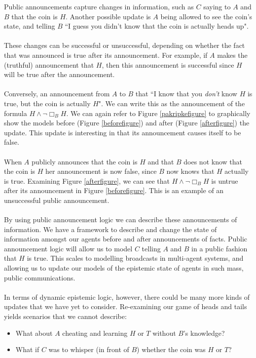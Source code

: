 Public announcements capture changes in information, such as $C$ saying to
$A$ and $B$ that the coin is $H$.
Another possible update is $A$ being allowed to see the coin's state, and
telling $B$ ``I guess you didn't know that the coin is actually heads up".\\
\\
These changes can be successful or unsuccessful, depending on whether the fact
that was announced is true after its announcement.
For example, if $A$ makes the (truthful) announcement that $H$, then this
announcement is successful since $H$ will be true after the announcement.\\
\\
Conversely, an announcement from $A$ to $B$ that ``I know that you {\em don't} know $H$
is true, but the coin is actually $H$".
We can write this as the announcement of the formula $H \land \neg \Box_B H$.
We can again refer to Figure \ref{pakripkefigure} to graphically show the models
before (Figure \ref{beforefigure}) and after (Figure \ref{afterfigure}) the update.
This update is interesting in that its announcement causes itself to be false.\\
\\
When $A$ publicly announces that the coin is $H$ and that $B$ does not know that
the coin is $H$ her announcement is now false, since $B$ now knows that $H$
actually is true.
Examining Figure \ref{afterfigure}, we can see that $H \land \neg \Box_B H$ is
untrue after its announcement in Figure \ref{beforefigure}.
This is an example of an unsuccessful public announcement.\\
\\
By using public announcement logic we can describe these announcements of
information.
We have a framework to describe and change the state of information amongst our
agents before and after announcements of facts.
Public announcement logic will allow us to model $C$ telling $A$ and $B$ in a
public fashion that $H$ is true.
This scales to modelling broadcasts in multi-agent systems, and allowing us to
update our models of the epistemic state of agents in such mass, public communications.\\
\\
In terms of dynamic epistemic logic, however, there could be many more kinds of
updates that we have yet to consider.
Re-examining our game of heads and tails yields scenarios that we cannot
describe:
\begin{itemize}
	\item What about $A$ cheating and learning $H$ or $T$ without $B$'s knowledge?
	\item What if $C$ was to whisper (in front of $B$) whether the coin was $H$
	or $T$?
\end{itemize}
